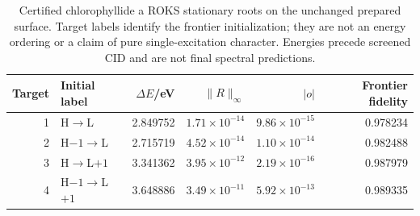 \begin{table}[!htbp]\centering
\caption{Certified chlorophyllide a ROKS stationary roots on the unchanged prepared surface. Target labels identify the frontier initialization; they are not an energy ordering or a claim of pure single-excitation character. Energies precede screened CID and are not final spectral predictions.}\label{tab:chlorophyllideroks}
\begin{tabular}{rlrrrr}\toprule
Target & Initial label & $\Delta E$/eV & $\|R\|_\infty$ & $|o|$ & Frontier fidelity\\\midrule
1 & H$\to$L & 2.849752 & $1.71\times10^{-14}$ & $9.86\times10^{-15}$ & 0.978234\\
2 & H$-1\to$L & 2.715719 & $4.52\times10^{-14}$ & $1.10\times10^{-14}$ & 0.982488\\
3 & H$\to$L$+1$ & 3.341362 & $3.95\times10^{-12}$ & $2.19\times10^{-16}$ & 0.987979\\
4 & H$-1\to$L$+1$ & 3.648886 & $3.49\times10^{-11}$ & $5.92\times10^{-13}$ & 0.989335\\
\bottomrule\end{tabular}
\end{table}

